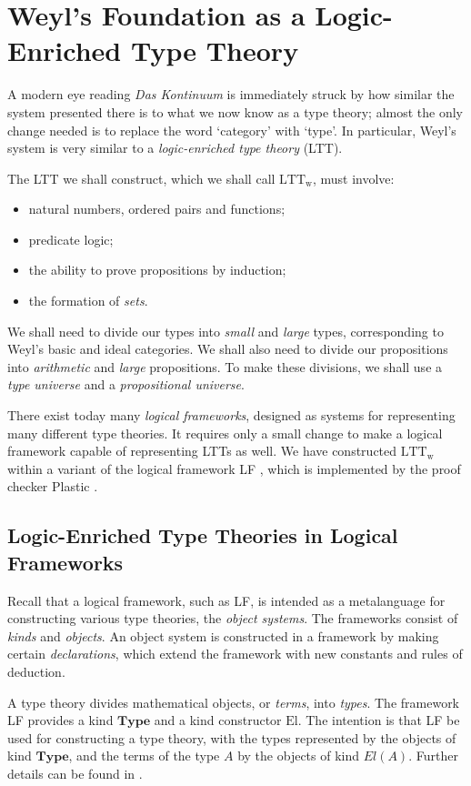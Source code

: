 \documentclass[acmtocl]{acmtrans2m}
\newcommand{\LTTW}{\ensuremath{\mathrm{LTT}_\mathrm{w}}}
\newcommand{\El}[1]{El \left( {#1} \right)}
\newcommand{\Type}{\mathbf{Type}}
\begin{document}
\section{Weyl's Foundation as a Logic-Enriched Type Theory}
\label{section:lett}

A modern eye reading \emph{Das Kontinuum}
is immediately struck by how similar the system presented there is to what we now know as
a type theory; almost the only change needed is to replace the word
`category' with `type'.  In particular, Weyl's system is very
similar to a \emph{logic-enriched type theory} (LTT).

The LTT we shall construct, which we shall call \LTTW, must involve:
\begin{itemize}
 \item
 natural numbers, ordered pairs and functions;
\item  predicate logic;
\item the ability to prove propositions by induction;
\item the formation of \emph{sets}.
\end{itemize}
We shall need to divide our types into \emph{small} and \emph{large} types, corresponding to Weyl's basic and ideal categories.  We shall also need to divide our propositions into \emph{arithmetic} and \emph{large} propositions.  To make these divisions, we shall use a \emph{type universe} and a \emph{propositional universe}.

There exist today many \emph{logical frameworks}, designed as
systems for representing many different type theories.  It requires
only a small change to make a logical framework capable of
representing LTTs as well.
We have constructed $\LTTW$ within a variant of the logical framework
LF \cite{luo:car},
which is implemented by the proof checker Plastic \cite{plastic}.

\subsection{Logic-Enriched Type Theories in Logical Frameworks}

Recall that a logical framework, such as LF, is intended as a metalanguage for constructing various
type theories, the \emph{object systems}.  The frameworks consist of \emph{kinds} and \emph{objects}.  An object system is constructed in a framework by making certain \emph{declarations}, which extend the framework with new constants and rules of deduction.

A type theory divides mathematical objects, or \emph{terms}, into \emph{types}.  The framework LF provides a kind $\Type$ and a kind constructor $\mathrm{El}$.  The intention is that LF be used for constructing a type theory, with the types represented by the objects of kind $\Type$, and the terms of the type $A$ by the objects of kind $\El{A}$.  Further details can be found in \cite{luo:car}.
\end{document}
